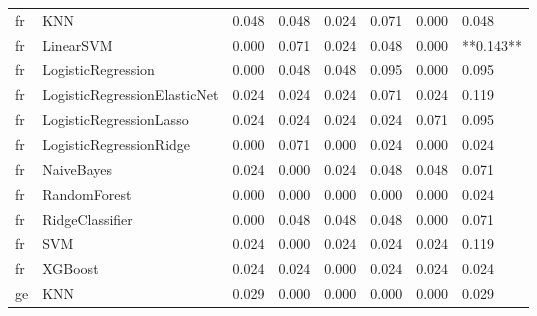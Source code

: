 \begin{tabular}{llllllll}
      fr &                          KNN & 0.048 &                     0.048 &                 0.024 &                  0.071 &                                   0.000 &     0.048 \\
      fr &                    LinearSVM & 0.000 &                     0.071 &                 0.024 &                  0.048 &                                   0.000 & **0.143** \\
      fr &           LogisticRegression & 0.000 &                     0.048 &                 0.048 &                  0.095 &                                   0.000 &     0.095 \\
      fr & LogisticRegressionElasticNet & 0.024 &                     0.024 &                 0.024 &                  0.071 &                                   0.024 &     0.119 \\
      fr &      LogisticRegressionLasso & 0.024 &                     0.024 &                 0.024 &                  0.024 &                                   0.071 &     0.095 \\
      fr &      LogisticRegressionRidge & 0.000 &                     0.071 &                 0.000 &                  0.024 &                                   0.000 &     0.024 \\
      fr &                   NaiveBayes & 0.024 &                     0.000 &                 0.024 &                  0.048 &                                   0.048 &     0.071 \\
      fr &                 RandomForest & 0.000 &                     0.000 &                 0.000 &                  0.000 &                                   0.000 &     0.024 \\
      fr &              RidgeClassifier & 0.000 &                     0.048 &                 0.048 &                  0.048 &                                   0.000 &     0.071 \\
      fr &                          SVM & 0.024 &                     0.000 &                 0.024 &                  0.024 &                                   0.024 &     0.119 \\
      fr &                      XGBoost & 0.024 &                     0.024 &                 0.000 &                  0.024 &                                   0.024 &     0.024 \\
      ge &                          KNN & 0.029 &                     0.000 &                 0.000 &                  0.000 &                                   0.000 &     0.029 \\

\end{tabular}
